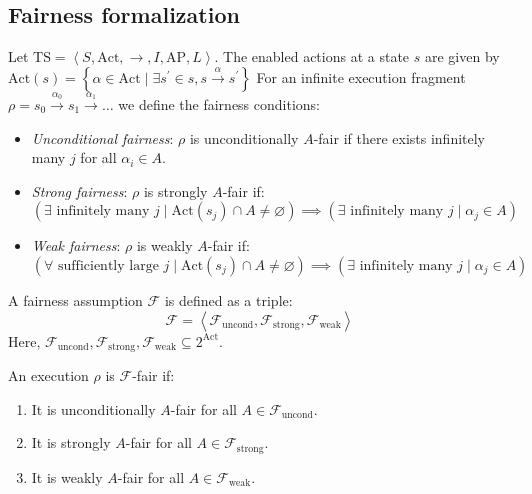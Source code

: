 \subsection{Fairness formalization}
\begin{definition}
    Let $\text{TS}=\left\langle S,\text{Act},\rightarrow,I,\text{AP},L\right\rangle$. 
    The enabled actions at a state $s$ are given by $\text{Act}(s)=\left\{\alpha\in\text{Act}\mid\exists s^\prime \in s, s\overset{\alpha}{\rightarrow}s^\prime\right\}$
    For an infinite execution fragment $\rho=s_0\overset{\alpha_0}{\rightarrow}s_1\overset{\alpha_1}{\rightarrow}\dots$ we define the fairness conditions:
    \begin{itemize}
        \item \textit{Unconditional fairness}: $\rho$ is unconditionally $A$-fair if there exists infinitely many $j$ for all $\alpha_i\in A$. 
        \item \textit{Strong fairness}: $\rho$ is strongly $A$-fair if: 
            \[\left(\exists \text{ infinitely many }j\mid\text{Act}(s_j)\cap A\neq\varnothing\right)\implies\left(\exists \text{ infinitely many }j\mid\alpha_j\in A\right)\]
        \item \textit{Weak fairness}: $\rho$ is weakly $A$-fair if: 
            \[\left(\forall \text{ sufficiently large }j\mid\text{Act}(s_j)\cap A\neq\varnothing\right)\implies\left(\exists \text{ infinitely many }j\mid\alpha_j\in A\right)\]
    \end{itemize}
\end{definition}
\begin{definition}
    A fairness assumption $\mathcal{F}$  is defined as a triple: 
    \[\mathcal{F}=\left\langle \mathcal{F}_{\text{uncond}},\mathcal{F}_{\text{strong}},\mathcal{F}_{\text{weak}}\right\rangle\] 
    Here, $\mathcal{F}_{\text{uncond}},\mathcal{F}_{\text{strong}},\mathcal{F}_{\text{weak}}\subseteq 2^{\text{Act}}$. 
\end{definition}
\noindent An execution $\rho$ is $\mathcal{F}$-fair if: 
\begin{enumerate}
    \item It is unconditionally $A$-fair for all $A \in \mathcal{F}_{\text{uncond}}$.
    \item It is strongly $A$-fair for all $A \in \mathcal{F}_{\text{strong}}$.
    \item It is weakly $A$-fair for all $A \in \mathcal{F}_{\text{weak}}$.
\end{enumerate}

